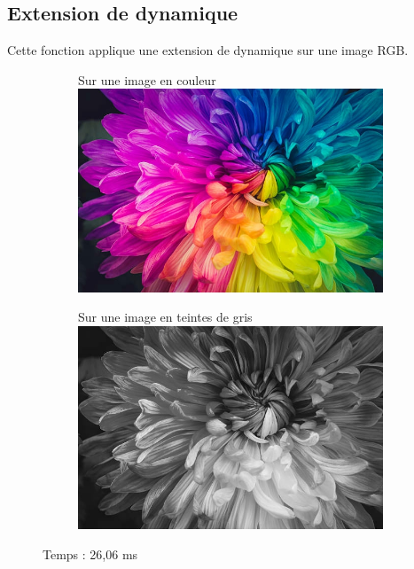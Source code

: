 \documentclass{article}
\begin{document}
\bigbreak
\subsection{Extension de dynamique}
\medbreak

Cette fonction applique une extension de dynamique sur une image RGB.
\medbreak

\begin{figure}[h!]
    \centering
    \begin{subfigure}[b]{0.4\linewidth}
        Sur une image en couleur
        \medbreak
        \includegraphics[width=\linewidth]{./Images/Multicolor/Color_Linear_Extension.jpg}
    \end{subfigure}
    \begin{subfigure}[b]{0.4\linewidth}
        Sur une image en teintes de gris
        \medbreak
        \includegraphics[width=\linewidth]{./Images/Multicolor/Gray_Linear_Extension.jpg}
    \end{subfigure}
    \bigbreak
    Temps  : 26,06 ms
\end{figure}
\end{document}
